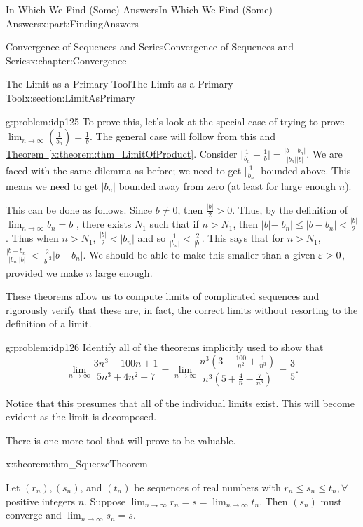 \begin{partptx}{In Which We Find (Some) Answers}{}{In Which We Find (Some) Answers}{}{}{x:part:FindingAnswers}
\begin{chapterptx}{Convergence of Sequences and Series}{}{Convergence of Sequences and Series}{}{}{x:chapter:Convergence}
\begin{sectionptx}{The Limit as a Primary Tool}{}{The Limit as a Primary Tool}{}{}{x:section:LimitAsPrimary}
\begin{problem}{}{g:problem:idp125}
				To prove this, let's look at the special case of trying to prove \(\lim_{n\rightarrow\infty}\left(\frac{1}{b_n}\right)=\frac{1}{b}\). The general case will follow from this and \hyperref[x:theorem:thm_LimitOfProduct]{Theorem~{\xreffont\ref{x:theorem:thm_LimitOfProduct}}}. Consider \(\big|\frac{1}{b_n}-\frac{1}{b}\big|=\frac{|b-b_n|}{|b_n||b|}\). We are faced with the same dilemma as before; we need to get \(\big|\frac{1}{b_n}\big|\) bounded above. This means we need to get \(|b_n|\) bounded away from zero (at least for large enough \(n\)).%
				\par
				This can be done as follows. Since \(b\neq 0\), then \(\frac{|b|}{2}>0\). Thus, by the definition of \(\lim_{n\rightarrow\infty}b_n=b\) , there exists \(N_1\) such that if \(n>N_1\), then \(|b\mathopen|-|b_n|\leq\big|b-b_n\big|\lt \frac{|b|}{2}\). Thus when \(n>N_1\), \(\frac{|b|}{2}\lt |b_n|\) and so \(\frac{1}{|b_n|}\lt \frac{2}{|b|}\). This says that for \(n>N_1\), \(\frac{|b-b_n|}{|b_n||b|}\lt \frac{2}{|b|^2}|b-b_n|\). We should be able to make this smaller than a given \(\varepsilon>0\), provided we make \(n\) large enough.%
			\end{problem}
			These theorems allow us to compute limits of complicated sequences and rigorously verify that these are, in fact, the correct limits without resorting to the definition of a limit.%
			\begin{problem}{}{g:problem:idp126}%
				 Identify all of the theorems implicitly used to show that%
				\begin{equation*}
					\lim_{n\rightarrow\infty}\frac{3n^3-100n+1}{5n^3+4n^2-7}=\lim_{n \rightarrow\infty}\frac{n^3\left(3-\frac{100}{n^2}+\frac{1}{n^3}\right)}{n^3 \left(5+\frac{4}{n}-\frac{7}{n^3}\right)}=\frac{3}{5}\text{.}
				\end{equation*}
				\par
				Notice that this presumes that all of the individual limits exist. This will become evident as the limit is decomposed.%
			\end{problem}
			There is one more tool that will prove to be valuable.%
			\begin{theorem}{}{}{x:theorem:thm_SqueezeTheorem}%
				\par
				Let \(\left(r_n\right),\left(s_n\right)\), and \(\left(t_n\right)\) be sequences of real numbers with \(r_n\leq s_n\leq t_n,\forall\) positive integers \(n\). Suppose \(\lim_{n\rightarrow\infty}r_n=s=\lim_{n\rightarrow\infty}t_n\). Then \(\left(s_n\right)\) must converge and \(\lim_{n\rightarrow\infty}s_n=s\).%

\end{theorem}
\end{sectionptx}
\end{chapterptx}
\end{partptx}
